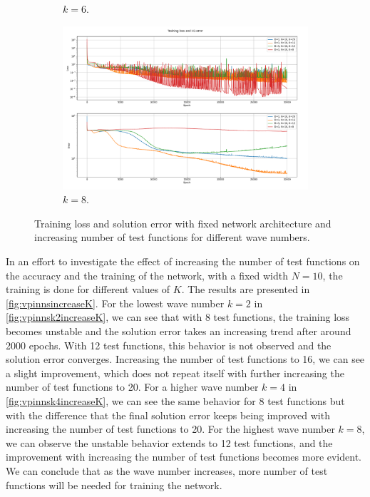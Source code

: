 \begin{figure}[h!]
\begin{subfigure}[b]{0.48\textwidth}
        \caption{$k=6$.}
        \label{fig:vpinnsk6increaseK}
    \end{subfigure}
    \hfill
    \begin{subfigure}[b]{0.48\textwidth}
        \includegraphics[width=\textwidth]{img/VPINN-Comparison-k8increaseK.png}
        \caption{$k=8$.}
        \label{fig:vpinnsk8increaseK}
    \end{subfigure}
    \caption{Training loss and solution error with fixed network architecture and increasing number of test functions for different wave numbers.}
    \label{fig:vpinnsincreaseK}
\end{figure}

In an effort to investigate the effect of increasing the number of test functions on the accuracy and the training of the network, with a fixed width $N=10$, the training is done for different values of $K$. The results are presented in \autoref{fig:vpinnsincreaseK}. For the lowest wave number $k=2$ in \autoref{fig:vpinnsk2increaseK}, we can see that with 8 test functions, the training loss becomes unstable and the solution error takes an increasing trend after around 2000 epochs. With 12 test functions, this behavior is not observed and the solution error converges. Increasing the number of test functions to 16, we can see a slight improvement, which does not repeat itself with further increasing the number of test functions to 20. For a higher wave number $k=4$ in \autoref{fig:vpinnsk4increaseK}, we can see the same behavior for 8 test functions but with the difference that the final solution error keeps being improved with increasing the number of test functions to 20. For the highest wave number $k=8$, we can observe the unstable behavior extends to 12 test functions, and the improvement with increasing the number of test functions becomes more evident. We can conclude that as the wave number increases, more number of test functions will be needed for training the network.

